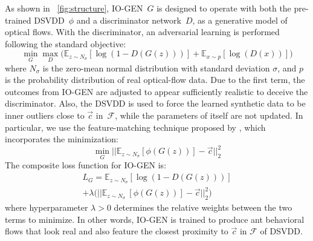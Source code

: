 \documentclass[letterpaper]{article} %
\let\orgautoref\autoref
\renewcommand{\autoref}
{\def\equationautorefname{Equation}%
	\def\figureautorefname{Fig.}%
	\def\subfigureautorefname{Fig.}%
	\def\Itemautorefname{item}%
	\def\tableautorefname{Table}%
	\def\exerciseautorefname{Exercise}%
	\def\starexerciseautorefname{Exercise}%
	\def\sectionautorefname{Section}%
	\def\subsectionautorefname{Section}%
	\def\subsubsectionautorefname{Section}%
	\def\chapterautorefname{Section}%
	\def\partautorefname{Part}%
	\orgautoref}
\begin{document}
As shown in~\autoref{fig:structure}, \mbox{IO-GEN}~$G$ is designed to operate
with both the pre-trained DSVDD~$\phi$ and a discriminator network~$D$,
as a generative model of optical flows. With the discriminator, an
adversarial learning is performed following the standard objective:
%
\begin{equation*}
    \label{eq:obj1}
    \min_{G} \max_{D}
    \Big( \mathbb{E}_{z \sim \mathit{N_{\sigma}}} [\log(1 - D(G(z)))]
    + \mathbb{E}_{x \sim p} [\log(D(x))] \Big)
\end{equation*}
%
where $\mathit{N_{\sigma}}$ is the zero-mean normal distribution with
standard deviation $\sigma$, and $p$ is the probability distribution of
real optical-flow data. Due to the first term, the outcomes from
\mbox{IO-GEN} are adjusted to appear sufficiently realistic to deceive the
discriminator. Also, the DSVDD is used to force the learned synthetic
data to be inner outliers close to $\vec{c}$ in~$\mathcal{F}$, while the
parameters of itself are not updated. In particular, we use the
feature-matching technique proposed by \citet{SGZCRC16}, which
incorporates the minimization:
%
\begin{equation*}
	\label{eq:obj2}
	\min_{G}
	|| \mathbb{E}_{z \sim \mathit{N_{\sigma}}} [\phi(G(z))]
	- \vec{c} ||^{2}_{2}
\end{equation*}
%
%
The composite loss function for \mbox{IO-GEN} is:
%
\begin{multline*}
\label{eq:loss}
	\mathit{L}_{G} =
	\mathbb{E}_{z \sim \mathit{N_{\sigma}}} [\log(1 - D(G(z)))] \\
	+ \lambda \Big( || \mathbb{E}_{z \sim \mathit{N_{\sigma}}} \
	[\phi(G(z))] - \vec{c} ||^{2}_{2} \Big)
\end{multline*}
%
where hyperparameter $\lambda > 0$ determines the relative
weights between the two terms to minimize. In other words, \mbox{IO-GEN} is
trained to produce ant behavioral flows that look real and
also feature the closest proximity to $\vec{c}$ in $\mathcal{F}$ of
DSVDD.
\end{document}
